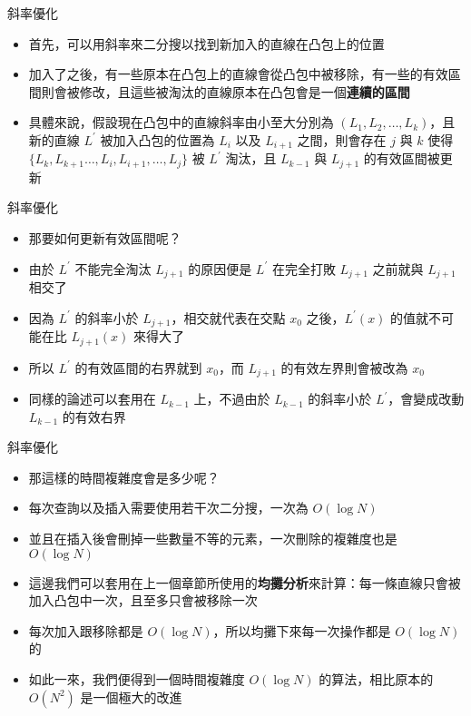 \documentclass[standalone]{beamer}
\begin{document}
\begin{frame}{斜率優化}
  \begin{itemize}
    \item 首先，可以用斜率來二分搜以找到新加入的直線在凸包上的位置
    \item 加入了之後，有一些原本在凸包上的直線會從凸包中被移除，有一些的有效區間則會被修改，且這些被淘汰的直線原本在凸包會是一個\textbf{連續的區間}
    \item 具體來說，假設現在凸包中的直線斜率由小至大分別為 $(L_1, L_2, \ldots, L_k)$，且新的直線 $L^\prime$ 被加入凸包的位置為 $L_{i}$ 以及 $L_{i + 1}$ 之間，則會存在 $j$ 與 $k$ 使得 $\{L_k, L_{k + 1} \ldots, L_{i}, L_{i + 1}, \ldots, L_{j} \}$ 被 $L^\prime$ 淘汰，且 $L_{k - 1}$ 與 $L_{j + 1}$ 的有效區間被更新
  \end{itemize}
\end{frame}

\begin{frame}{斜率優化}
  \begin{itemize}
    \item 那要如何更新有效區間呢？
    \item 由於 $L^\prime$ 不能完全淘汰 $L_{j + 1}$ 的原因便是 $L^\prime$ 在完全打敗 $L_{j + 1}$ 之前就與 $L_{j + 1}$ 相交了
    \item 因為 $L^\prime$ 的斜率小於 $L_{j + 1}$，相交就代表在交點 $x_0$ 之後，$L^\prime(x)$ 的值就不可能在比 $L_{j + 1}(x)$ 來得大了
    \item 所以 $L^\prime$ 的有效區間的右界就到 $x_0$，而 $L_{j + 1}$ 的有效左界則會被改為 $x_0$
    \item 同樣的論述可以套用在 $L_{k - 1}$ 上，不過由於 $L_{k - 1}$ 的斜率小於 $L^\prime$，會變成改動 $L_{k - 1}$ 的有效右界
  \end{itemize}
\end{frame}

\begin{frame}{斜率優化}
  \begin{itemize}
    \item 那這樣的時間複雜度會是多少呢？
    \item 每次查詢以及插入需要使用若干次二分搜，一次為 $O(\log{N})$
    \item 並且在插入後會刪掉一些數量不等的元素，一次刪除的複雜度也是 $O(\log{N})$
    \item 這邊我們可以套用在上一個章節所使用的\textbf{均攤分析}來計算：每一條直線只會被加入凸包中一次，且至多只會被移除一次
    \item 每次加入跟移除都是 $O(\log{N})$，所以均攤下來每一次操作都是 $O(\log{N})$ 的
    \item 如此一來，我們便得到一個時間複雜度 $O(\log{N})$ 的算法，相比原本的 $O(N^2)$ 是一個極大的改進
  \end{itemize}
\end{frame}
\end{document}
